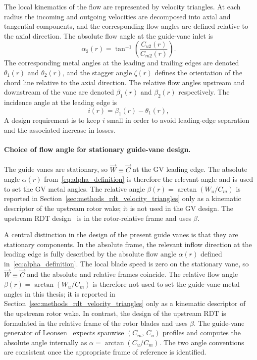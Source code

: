 The local kinematics of the flow are represented by velocity triangles. At each radius the incoming and outgoing velocities are decomposed into axial and tangential components, and the corresponding flow angles are defined relative to the axial direction. The absolute flow angle at the guide-vane inlet is
\begin{equation}
\alpha_2(r) = \tan^{-1}\!\left(\frac{C_{u2}(r)}{C_{m2}(r)}\right).
\label{eq:alpha_inlet}
\end{equation}
The corresponding metal angles at the leading and trailing edges are denoted $\theta_1(r)$ and $\theta_2(r)$, and the stagger angle $\zeta(r)$ defines the orientation of the chord line relative to the axial direction. The relative flow angles upstream and downstream of the vane are denoted $\beta_1(r)$ and $\beta_2(r)$ respectively. The incidence angle at the leading edge is
\begin{equation}
i(r) = \beta_1(r) - \theta_1(r),
\label{eq:incidence}
\end{equation}
A design requirement is to keep $i$ small in order to avoid leading-edge separation and the associated increase in losses.

\paragraph{Choice of flow angle for stationary guide-vane design.}
The guide vanes are stationary, so $\vec{W}\equiv \vec{C}$ at the GV leading edge. The absolute angle $\alpha(r)$ from~\eqref{eq:alpha_definition} is therefore the relevant angle and is used to set the GV metal angles. The relative angle $\beta(r)=\arctan(W_u/C_m)$ is reported in Section~\ref{sec:methods_rdt_velocity_triangles} only as a kinematic descriptor of the upstream rotor wake; it is not used in the GV design. The upstream RDT design~\cite{DjupeslandTrivedi2025} is in the rotor-relative frame and uses $\beta$.


A central distinction in the design of the present guide vanes is that they are stationary components. In the absolute frame, the relevant inflow direction at the leading edge is fully described by the absolute flow angle $\alpha(r)$ defined in~\eqref{eq:alpha_definition}. The local blade speed is zero on the stationary vane, so $\vec{W}\equiv \vec{C}$ and the absolute and relative frames coincide. The relative flow angle $\beta(r)=\arctan(W_u/C_m)$ is therefore not used to set the guide-vane metal angles in this thesis; it is reported in Section~\ref{sec:methods_rdt_velocity_triangles} only as a kinematic descriptor of the upstream rotor wake. In contrast, the design of the upstream RDT \cite{DjupeslandTrivedi2025} is formulated in the relative frame of the rotor blades and uses $\beta$. The guide-vane generator of Leonsen~\cite{Leonsen2025} expects spanwise $(C_m,\,C_u)$ profiles and computes the absolute angle internally as $\alpha = \arctan(C_u/C_m)$. The two angle conventions are consistent once the appropriate frame of reference is identified.

